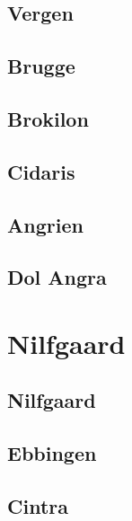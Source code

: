 \subsection{Vergen}

\subsection{Brugge}

\subsection{Brokilon}

\subsection{Cidaris}

\subsection{Angrien}

\subsection{Dol Angra}



\section{Nilfgaard}

\subsection{Nilfgaard}

\subsection{Ebbingen}

\subsection{Cintra}